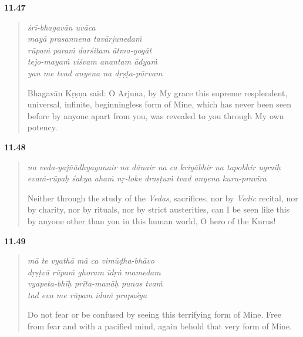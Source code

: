\par\noindent\textbf{11.47}\par
\begin{verse}
\textit{śrī-bhagavān uvāca} \\
\textit{mayā prasannena tavārjunedaṁ} \\
\textit{rūpaṁ paraṁ darśitam ātma-yogāt} \\
\textit{tejo-mayaṁ viśvam anantam ādyaṁ} \\
\textit{yan me tvad anyena na dṛṣṭa-pūrvam}

\noindent Bhagavān Kṛṣṇa said: O Arjuna, by My grace this supreme resplendent, universal, infinite, beginningless form of Mine, which has never been seen before by anyone apart from you, was revealed to you through My own potency.
\end{verse}
\par



\par\noindent\textbf{11.48}\par
\begin{verse}
\textit{na veda-yajñādhyayanair na dānair na ca kriyābhir na tapobhir ugraiḥ} \\
\textit{evaṁ-rūpaḥ śakya ahaṁ nṛ-loke draṣṭuṁ tvad anyena kuru-pravīra}

\noindent Neither through the study of the \textit{Vedas}, sacrifices, nor by \textit{Vedic} recital, nor by charity, nor by rituals, nor by strict austerities, can I be seen like this by anyone other than you in this human world, O hero of the Kurus!
\end{verse}
\par



\par\noindent\textbf{11.49}\par
\begin{verse}
\textit{mā te vyathā mā ca vimūḍha-bhāvo} \\
\textit{dṛṣṭvā rūpaṁ ghoram īdṛṅ mamedam} \\
\textit{vyapeta-bhīḥ prīta-manāḥ punas tvaṁ} \\
\textit{tad eva me rūpam idaṁ prapaśya}

\noindent Do not fear or be confused by seeing this terrifying form of Mine. Free from fear and with a pacified mind, again behold that very form of Mine.
\end{verse}
\par



